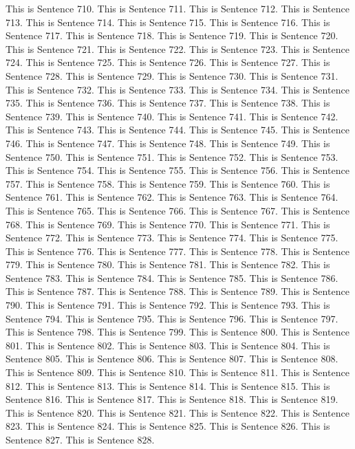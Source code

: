 \documentclass{article}
\begin{document}
This is Sentence 710.
This is Sentence 711.
This is Sentence 712.
This is Sentence 713.
This is Sentence 714.
This is Sentence 715.
This is Sentence 716.
This is Sentence 717.
This is Sentence 718.
This is Sentence 719.
This is Sentence 720.
This is Sentence 721.
This is Sentence 722.
This is Sentence 723.
This is Sentence 724.
This is Sentence 725.
This is Sentence 726.
This is Sentence 727.
This is Sentence 728.
This is Sentence 729.
This is Sentence 730.
This is Sentence 731.
This is Sentence 732.
This is Sentence 733.
This is Sentence 734.
This is Sentence 735.
This is Sentence 736.
This is Sentence 737.
This is Sentence 738.
This is Sentence 739.
This is Sentence 740.
This is Sentence 741.
This is Sentence 742.
This is Sentence 743.
This is Sentence 744.
This is Sentence 745.
This is Sentence 746.
This is Sentence 747.
This is Sentence 748.
This is Sentence 749.
This is Sentence 750.
This is Sentence 751.
This is Sentence 752.
This is Sentence 753.
This is Sentence 754.
This is Sentence 755.
This is Sentence 756.
This is Sentence 757.
This is Sentence 758.
This is Sentence 759.
This is Sentence 760.
This is Sentence 761.
This is Sentence 762.
This is Sentence 763.
This is Sentence 764.
This is Sentence 765.
This is Sentence 766.
This is Sentence 767.
This is Sentence 768.
This is Sentence 769.
This is Sentence 770.
This is Sentence 771.
This is Sentence 772.
This is Sentence 773.
This is Sentence 774.
This is Sentence 775.
This is Sentence 776.
This is Sentence 777.
This is Sentence 778.
This is Sentence 779.
This is Sentence 780.
This is Sentence 781.
This is Sentence 782.
This is Sentence 783.
This is Sentence 784.
This is Sentence 785.
This is Sentence 786.
This is Sentence 787.
This is Sentence 788.
This is Sentence 789.
This is Sentence 790.
This is Sentence 791.
This is Sentence 792.
This is Sentence 793.
This is Sentence 794.
This is Sentence 795.
This is Sentence 796.
This is Sentence 797.
This is Sentence 798.
This is Sentence 799.
This is Sentence 800.
This is Sentence 801.
This is Sentence 802.
This is Sentence 803.
This is Sentence 804.
This is Sentence 805.
This is Sentence 806.
This is Sentence 807.
This is Sentence 808.
This is Sentence 809.
This is Sentence 810.
This is Sentence 811.
This is Sentence 812.
This is Sentence 813.
This is Sentence 814.
This is Sentence 815.
This is Sentence 816.
This is Sentence 817.
This is Sentence 818.
This is Sentence 819.
This is Sentence 820.
This is Sentence 821.
This is Sentence 822.
This is Sentence 823.
This is Sentence 824.
This is Sentence 825.
This is Sentence 826.
This is Sentence 827.
This is Sentence 828.
\end{document}
